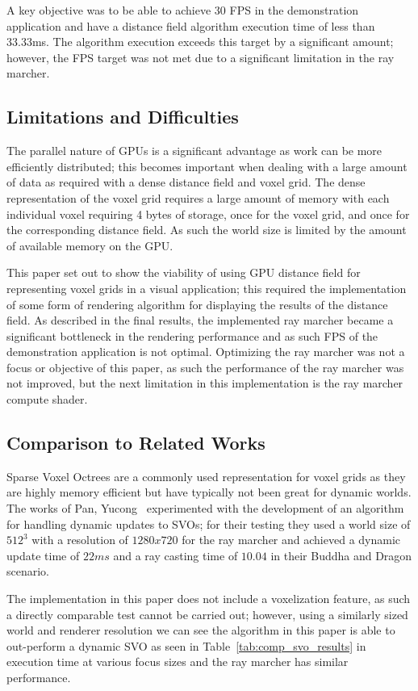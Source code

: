 A key objective was to be able to achieve 30 FPS in the demonstration application and have a distance field algorithm
execution time of less than 33.33ms. The algorithm execution exceeds this target by a significant amount; however,
the FPS target was not met due to a significant limitation in the ray marcher.

\subsection{Limitations and Difficulties}
The parallel nature of GPUs is a significant advantage as work can be more efficiently distributed; this becomes
important when dealing with a large amount of data as required with a dense distance field and voxel grid. The dense
representation of the voxel grid requires a large amount of memory with each individual voxel requiring 4 bytes of
storage, once for the voxel grid, and once for the corresponding distance field. As such the world size is limited by
the amount of available memory on the GPU.

This paper set out to show the viability of using GPU distance field for representing voxel grids in a visual
application; this required the implementation of some form of rendering algorithm for displaying the results of the
distance field. As described in the final results, the implemented ray marcher became a significant bottleneck in the
rendering performance and as such FPS of the demonstration application is not optimal. Optimizing the ray marcher was
not a focus or objective of this paper, as such the performance of the ray marcher was not improved, but the next
limitation in this implementation is the ray marcher compute shader.

\subsection{Comparison to Related Works}
Sparse Voxel Octrees are a commonly used representation for voxel grids as they are highly memory efficient but have
typically not been great for dynamic worlds. The works of Pan, Yucong~\cite{pan2021dynamic} experimented with the
development of an algorithm for handling dynamic updates to SVOs; for their testing they used a world size of $512^3$
with a resolution of $1280x720$ for the ray marcher and achieved a dynamic update time of $22ms$ and a ray casting time
of $10.04$ in their Buddha and Dragon scenario.

The implementation in this paper does not include a voxelization feature, as such a directly comparable test cannot be
carried out; however, using a similarly sized world and renderer resolution we can see the algorithm in this paper is
able to out-perform a dynamic SVO as seen in Table~\ref{tab:comp_svo_results} in execution time at various focus sizes and
the ray marcher has similar performance.

